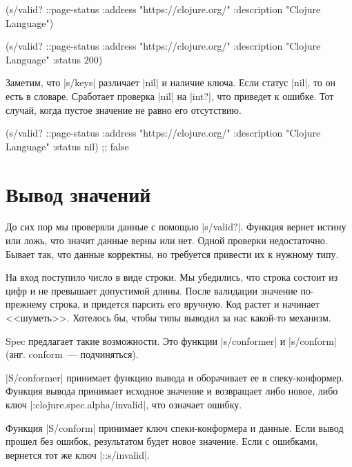 \begin{english}
  \begin{clojure}
(s/valid? ::page-status
          {:address "https://clojure.org/"
           :description "Clojure Language"})

(s/valid? ::page-status
          {:address "https://clojure.org/"
           :description "Clojure Language"
           :status 200})
  \end{clojure}
\end{english}

Заметим, что \spverb|s/keys| различает \spverb|nil| и наличие ключа. Если статус
\spverb|nil|, то он есть в словаре. Сработает проверка \spverb|nil| на
\spverb|int?|, что приведет к ошибке. Тот случай, когда пустое значение не равно
его отсутствию.

\begin{english}
  \begin{clojure}
(s/valid? ::page-status
          {:address "https://clojure.org/"
           :description "Clojure Language"
           :status nil})
;; false
  \end{clojure}
\end{english}

\section{Вывод значений}

\label{spec-conform}

До сих пор мы проверяли данные с помощью \spverb|s/valid?|. Функция вернет
истину или ложь, что значит данные верны или нет. Одной проверки
недостаточно. Бывает так, что данные корректны, но требуется привести их к
нужному типу.

На вход поступило число в виде строки. Мы убедились, что строка состоит из цифр
и не превышает допустимой длины. После валидации значение по-прежнему строка, и
придется парсить его вручную. Код растет и начинает <<шуметь>>. Хотелось бы,
чтобы типы выводил за нас какой-то механизм.

Spec предлагает такие возможности. Это функции \spverb|s/conformer| и
\spverb|s/conform| (анг. conform~--- подчиняться).

\spverb|S/conformer| принимает функцию вывода и оборачивает ее в
спеку-конформер. Функция вывода принимает исходное значение и возвращает либо
новое, либо ключ \spverb|:clojure.spec.alpha/invalid|, что означает ошибку.

Функция \spverb|S/conform| принимает ключ спеки-конформера и данные. Если вывод
прошел без ошибок, результатом будет новое значение. Если с ошибками, вернется
тот же ключ \spverb|::s/invalid|.

